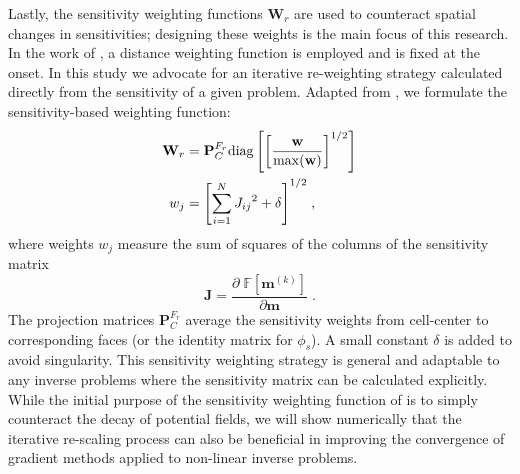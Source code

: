 \documentclass[paper]{geophysics}
\begin{document}
Lastly, the sensitivity weighting functions $\mathbf{W}_{r}$ are used to counteract spatial changes in sensitivities; designing these weights is the main focus of this research. In the work of \cite{LiOldenburg1996}, a distance weighting function is employed and is fixed at the onset. In this study we advocate for an iterative re-weighting strategy calculated directly from the sensitivity of a given problem. Adapted from \cite{Haber1997}, we formulate the sensitivity-based weighting function:
\begin{equation}\label{iter_sens_weight}
\begin{split}
\mathbf{W}_r &= \mathbf{P}_C^{F_r} \rm{diag} \left[ {\left[\frac{\mathbf{ w}}{\rm{max}(\mathbf{ w})}\right]}^{1/2}\right]\\
w_{j} &= {\left[\sum_{i=1}^{N}{J_{ij}}^2 + \delta \right]}^{1/2}\;,
\end{split}
\end{equation}
where weights $w_j$ measure the sum of squares of the columns of the sensitivity matrix
\begin{equation}\label{Jk}
\mathbf{J} = \frac{\partial \; \mathbb{F}[\mathbf{m}^{(k)}]}{\partial \boldsymbol{\mathbf{m}}}\;.
\end{equation}
The projection matrices $\mathbf{P}_C^{F_r}$ average the sensitivity weights from cell-center to corresponding faces (or the identity matrix for $\phi_s$). A small constant $\delta$ is added to avoid singularity. This sensitivity weighting strategy is general and adaptable to any inverse problems where the sensitivity matrix can be calculated explicitly.
While the initial purpose of the sensitivity weighting function of \cite{LiOldenburg1996} is to simply counteract the decay of potential fields, we will show numerically that the iterative re-scaling process can also be beneficial in improving the convergence of gradient methods applied to non-linear inverse problems.
\end{document}
